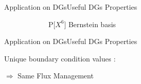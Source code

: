 \documentclass[10pt]{beamer}
\begin{document}
\begin{frame}{Application on DGs}{Useful DGs Properties}
\begin{figure}[H]
\begin{minipage}[bot]{0.36\linewidth}
    ~~~~~~ P[$X^6$] Bernstein basis


     \end{minipage}\hfill
    \end{figure}
    
  \end{frame}



\begin{frame}{Application on DGs}{Useful DGs Properties}

  Unique boundary condition values :

  \begin{figure}[H]
  \end{figure}
  
  $\Rightarrow$ Same Flux Management
\end{frame}
\end{document}
